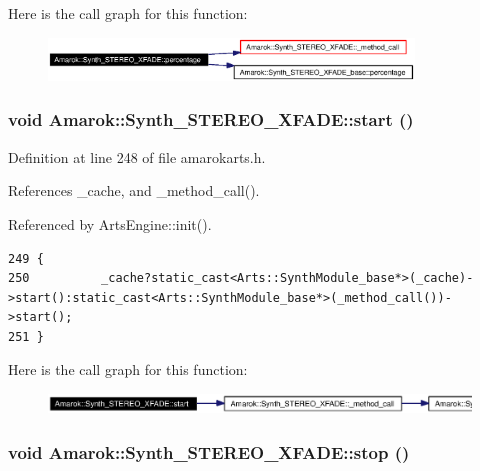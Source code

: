 Here is the call graph for this function:\begin{figure}[H]
\begin{center}
\leavevmode
\includegraphics[width=275pt]{classAmarok_1_1Synth__STEREO__XFADE_Amarok_1_1Synth__STEREO__XFADEa15_cgraph}
\end{center}
\end{figure}
\subsubsection{\setlength{\rightskip}{0pt plus 5cm}void Amarok::Synth\_\-STEREO\_\-XFADE::start ()\hspace{0.3cm}{\tt  [inline]}}\label{classAmarok_1_1Synth__STEREO__XFADE_Amarok_1_1Synth__STEREO__XFADEa10}




Definition at line 248 of file amarokarts.h.

References \_\-cache, and \_\-method\_\-call().

Referenced by Arts\-Engine::init().



\footnotesize\begin{verbatim}249 {
250          _cache?static_cast<Arts::SynthModule_base*>(_cache)->start():static_cast<Arts::SynthModule_base*>(_method_call())->start();
251 }
\end{verbatim}\normalsize 


Here is the call graph for this function:\begin{figure}[H]
\begin{center}
\leavevmode
\includegraphics[width=382pt]{classAmarok_1_1Synth__STEREO__XFADE_Amarok_1_1Synth__STEREO__XFADEa10_cgraph}
\end{center}
\end{figure}
\subsubsection{\setlength{\rightskip}{0pt plus 5cm}void Amarok::Synth\_\-STEREO\_\-XFADE::stop ()\hspace{0.3cm}{\tt  [inline]}}\label{classAmarok_1_1Synth__STEREO__XFADE_Amarok_1_1Synth__STEREO__XFADEa11}




